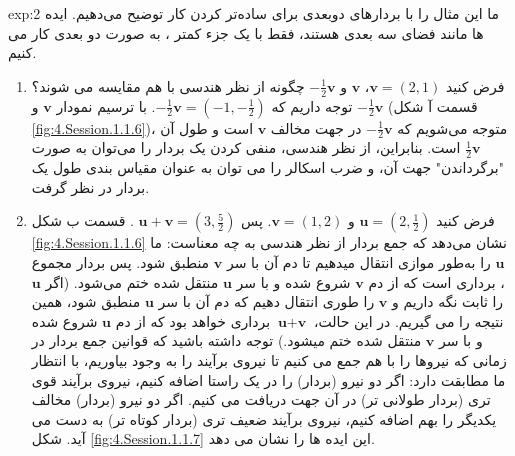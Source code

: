 {\begin{spacing}{1.5}
        \textbf{\vspace{-6pt}}
        \begin{example}{exp:2}
            \Large
            ما این مثال را با بردارهای دوبعدی برای ساده‌تر کردن کار توضیح می‌دهیم. ایده ها مانند فضای سه بعدی هستند، فقط با یک جزء کمتر ، به صورت دو بعدی کار می کنیم.\\
            \begin{enumerate}
                \item {فرض کنید $\textbf{v}=(2,1)$، $\textbf{v}$ و $-\frac{\displaystyle 1}{\displaystyle 2}\textbf{v}$ چگونه از نظر هندسی با هم مقایسه می شوند؟
                توجه داریم که $-\frac{\displaystyle 1}{\displaystyle 2}\textbf{v}=(-1,-\frac{\displaystyle 1}{\displaystyle 2})$.
                با ترسیم نمودار $\textbf{v}$ و $-\frac{\displaystyle 1}{\displaystyle 2}\textbf{v}$ (قسمت آ شکل \ref{fig:4.Session.1.1.6})،
                متوجه می‌شویم که $-\frac{\displaystyle 1}{\displaystyle 2}\textbf{v}$ در جهت مخالف $\textbf{v}$ است و طول آن $\frac{\displaystyle 1}{\displaystyle 2}\textbf{v}$ است.
                بنابراین، از نظر هندسی، منفی کردن یک بردار را می‌توان به صورت "برگرداندن" جهت آن،
                و ضرب اسکالر را می توان به عنوان مقیاس بندی طول یک بردار در نظر گرفت.}\\

                \item {فرض کنید $\textbf{u}=(2,\frac{\displaystyle 1}{\displaystyle 2})$ و $\textbf{v}=(1,2)$. پس $\textbf{u}+\textbf{v}=(3,\frac{\displaystyle 5}{\displaystyle 2})$ .
                قسمت ب شکل \ref{fig:4.Session.1.1.6} نشان می‌دهد که جمع بردار از نظر هندسی به چه معناست:
                ما $\textbf{u}$ را به‌طور موازی انتقال میدهیم تا دم آن با سر $\textbf{v}$ منطبق شود.
                پس بردار مجموع ، برداری است که از دم $\textbf{v}$ شروع شده و با سر $\textbf{u}$ منتقل شده ختم می‌شود.
                    (اگر $\textbf{u}$ را ثابت نگه داریم و $\textbf{v}$ را طوری انتقال دهیم که دم آن با سر $\textbf{u}$ منطبق شود، همین نتیجه را می گیریم.
                    در این حالت، $\textbf{u}+\textbf{v}$ برداری خواهد بود که از دم $\textbf{u}$ شروع شده و با سر $\textbf{v}$ منتقل شده ختم میشود.)
                    توجه داشته باشید که قوانین جمع بردار در زمانی که نیروها را با هم جمع می کنیم تا نیروی برآیند را به وجود بیاوریم، با انتظار ما مطابقت دارد:
                    اگر دو نیرو (بردار) را در یک راستا اضافه کنیم، نیروی برآیند قوی تری (بردار طولانی تر) در آن جهت دریافت می کنیم.
                    اگر دو نیرو (بردار) مخالف یکدیگر را بهم اضافه کنیم، نیروی برآیند ضعیف تری (بردار کوتاه تر) به دست می آید.
                    شکل \ref{fig:4.Session.1.1.7} این ایده ها را نشان می دهد.}\\


\end{enumerate}
\end{example}
\end{spacing}}

